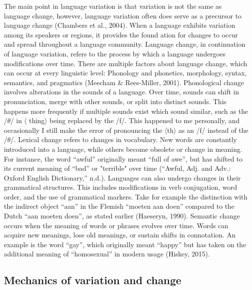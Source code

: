 The main point in language variation is that variation is not the same as language change, however, language variation often does serve as a precursor to language change (Chambers et al., 2004). When a language exhibits variation among its speakers or regions, it provides the found ation for changes to occur and spread throughout a language community. Language change, in continuation of language variation, refers to the process by which a language undergoes modifications over time. There are multiple factors about language change, which can occur at every linguistic level: Phonology and phonetics, morphology, syntax, semantics, and pragmatics (Meecham \& Rees-Miller, 2001). Phonological change involves alterations in the sounds of a language. Over time, sounds can shift in pronunciation, merge with other sounds, or split into distinct sounds. This happens more frequently if multiple sounds exist which sound similar, such as the /$\theta$/ in $\langle$ thing$\rangle$ being replaced by the /f/. This happened to me personally, and occasionally I still make the error of pronouncing the $\langle$th$\rangle$ as an /f/ instead of the /$\theta$/. Lexical change refers to changes in vocabulary. New words are constantly introduced into a language, while others become obsolete or change in meaning. For instance, the word “awful” originally meant “full of awe”, but has shifted to its current meaning of “bad” or "terrible" over time (“Awful, Adj. and Adv.: Oxford English Dictionary,” n.d.). Languages can also undergo changes in their grammatical structures. This includes modifications in verb conjugation, word order, and the use of grammatical markers. Take for example the distinction with the indirect object “aan” in the Flemish “moeten aan doen” compared to the Dutch “aan moeten doen”, as stated earlier (Haeseryn, 1990). Semantic change occurs when the meaning of words or phrases evolves over time. Words can acquire new meanings, lose old meanings, or sustain shifts in connotation. An example is the word “gay”, which originally meant “happy” but has taken on the additional meaning of “homosexual” in modern usage (Hiskey, 2015). 

\subsection{Mechanics of variation and change}

